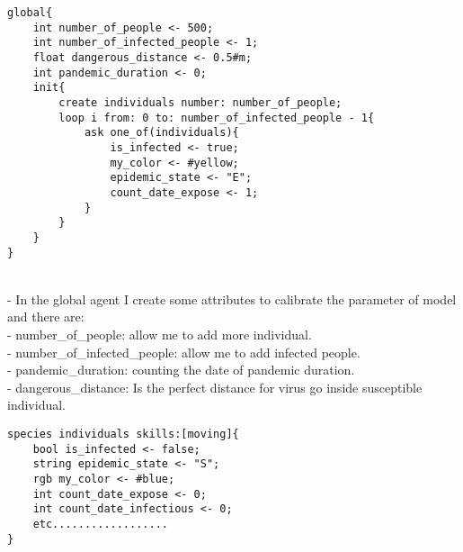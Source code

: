 \documentclass{article}
\begin{document}
\begin{tcolorbox}
\begin{lstlisting}
global{	
	int number_of_people <- 500;
	int number_of_infected_people <- 1;
	float dangerous_distance <- 0.5#m;
	int pandemic_duration <- 0;
	init{
		create individuals number: number_of_people;
		loop i from: 0 to: number_of_infected_people - 1{
			ask one_of(individuals){
				is_infected <- true;
				my_color <- #yellow;
				epidemic_state <- "E";
				count_date_expose <- 1;
			}
		}
	}
}
\end{lstlisting}
\end{tcolorbox}
\\[1\baselineskip]
- In the global agent I create some attributes to calibrate the parameter of model and there are:
\\
- number\_of\_people: allow me to add more individual.
\\
- number\_of\_infected\_people: allow me to add infected people.
\\
- pandemic\_duration: counting the date of pandemic duration.
\\
- dangerous\_distance: Is the perfect distance for virus go inside susceptible individual.
\\[1\baselineskip]
\begin{tcolorbox}
\begin{lstlisting}
species individuals skills:[moving]{
	bool is_infected <- false;
	string epidemic_state <- "S";
	rgb my_color <- #blue;
	int count_date_expose <- 0;
	int count_date_infectious <- 0;
	etc..................
}
\end{lstlisting}
\end{tcolorbox}
\newpage
\end{document}
